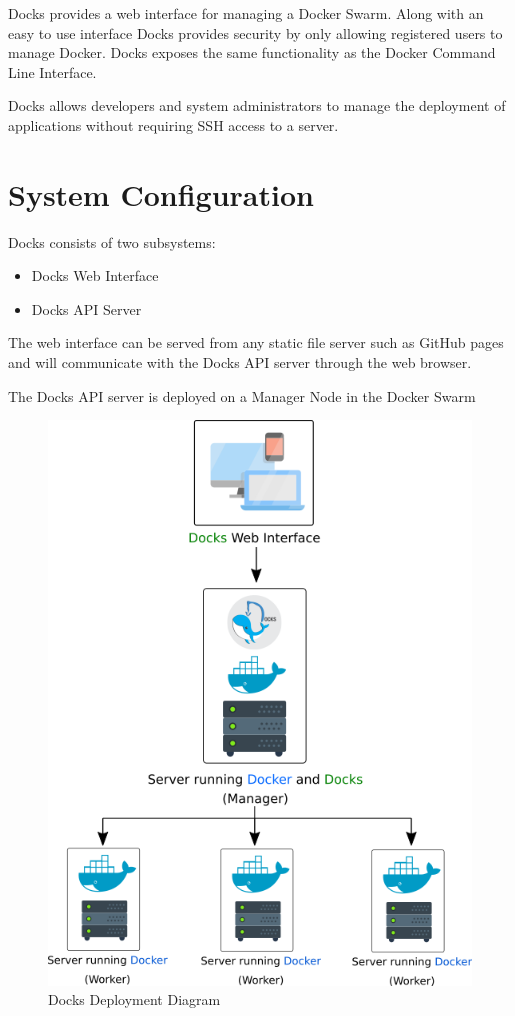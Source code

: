 \documentclass[]{article}
\begin{document}
Docks provides a web interface for managing a Docker Swarm.
Along with an easy to use interface Docks provides security by only
allowing registered users to manage Docker. Docks exposes the same
functionality as the Docker Command Line Interface.

Docks allows developers and system administrators to manage the
deployment of applications without requiring SSH access to a server.


\section{System Configuration}
Docks consists of two subsystems:
\begin{itemize}
	\item Docks Web Interface
	\item Docks API Server
\end{itemize}

The web interface can be served from any static file server such as GitHub pages
and will communicate with the Docks API server through the web browser.

The Docks API server is deployed on a Manager Node in the Docker Swarm

\begin{figure}[h!]
	\centering
	\includegraphics[scale=0.6]{deployment_diagram.png}
	\caption{Docks Deployment Diagram}
\end{figure}
\end{document}
